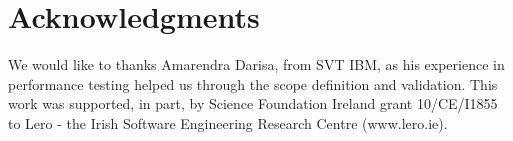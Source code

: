 \documentclass[runningheads,a4paper]{llncs}
\begin{document}

\section*{Acknowledgments}

We would like to thanks Amarendra Darisa, from SVT IBM, as his experience in
performance testing helped us through the scope definition and validation. This
work was supported, in part, by Science Foundation Ireland grant 10/CE/I1855 to Lero - the Irish Software Engineering Research Centre (www.lero.ie).




\end{document}
